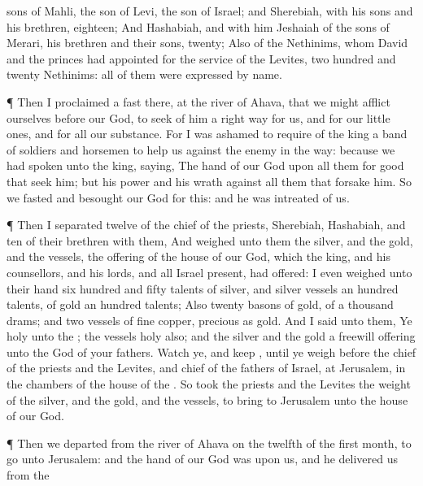 {sons of
Mahli, the
son of
Levi, the
son of
Israel; and
Sherebiah, with his
sons and his
brethren,
eighteen;
And
Hashabiah, and with him
Jeshaiah of the
sons of
Merari, his
brethren and their
sons,
twenty;
Also of the
Nethinims, whom
David and the
princes had
appointed for the
service of the
Levites, two
hundred and
twenty
Nethinims: all of them were
expressed by
name.
\par }{\PP {}¶ Then I
proclaimed a
fast there, at the
river of
Ahava, that we might
afflict ourselves
before our
God, to
seek of him a
right
way for us, and for our little
ones, and for all our
substance.
For I was
ashamed to
require of the
king a band of
soldiers and
horsemen to
help us against the
enemy in the
way: because we had
spoken unto the
king,
saying, The
hand of our
God
{} upon all them for
good that
seek him; but his
power and his
wrath
{} against all them that
forsake him.
So we
fasted and
besought our
God for this: and he was
intreated of us.
\par }{\PP {}¶ Then I
separated
twelve of the
chief of the
priests,
Sherebiah,
Hashabiah, and
ten of their
brethren with them,
And
weighed unto them the
silver, and the
gold, and the
vessels,
{} the
offering of the
house of our
God, which the
king, and his
counsellors, and his
lords, and all
Israel
{}
present, had
offered:
I even
weighed unto their
hand
six
hundred and
fifty
talents of
silver, and
silver
vessels an
hundred
talents,
{} of
gold an
hundred
talents;
Also
twenty
basons of
gold, of a
thousand
drams; and
two
vessels of
fine
copper,
precious as
gold.
And I
said unto them, Ye
{}
holy unto the
{}; the
vessels
{}
holy also; and the
silver and the
gold
{} a freewill
offering unto the
{}
God of your
fathers.
Watch ye, and
keep
{}, until ye
weigh
{}
before the
chief of the
priests and the
Levites, and
chief of the
fathers of
Israel, at
Jerusalem, in the
chambers of the
house of the
{}.
So
took the
priests and the
Levites the
weight of the
silver, and the
gold, and the
vessels, to
bring
{} to
Jerusalem unto the
house of our
God.
\par }{\PP {}¶ Then we
departed from the
river of
Ahava on the
twelfth
{} of the
first
month, to
go unto
Jerusalem: and the
hand of our
God was upon us, and he
delivered us from the
}
